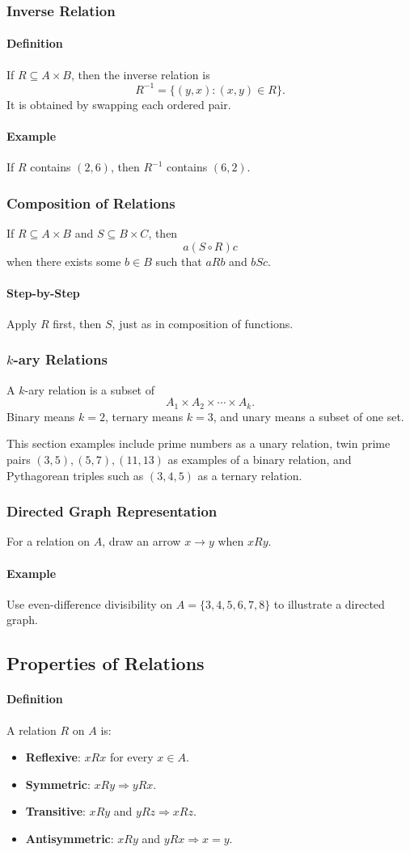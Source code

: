 \documentclass[12pt]{article}
\newcommand{\Definition}{\paragraph{Definition}}
\newcommand{\Step}{\paragraph{Step-by-Step}}
\newcommand{\Example}{\paragraph{Example}}
\begin{document}
\subsubsection{Inverse Relation}
\Definition If $R\subseteq A\times B$, then the inverse relation is
\[
R^{-1}=\{(y,x):(x,y)\in R\}.
\]
It is obtained by swapping each ordered pair.

\Example If $R$ contains $(2,6)$, then $R^{-1}$ contains $(6,2)$.

\subsubsection{Composition of Relations}
If $R\subseteq A\times B$ and $S\subseteq B\times C$, then
\[
a(S\circ R)c
\]
when there exists some $b\in B$ such that $aRb$ and $bSc$.

\Step
Apply $R$ first, then $S$, just as in composition of functions.

\subsubsection{$k$-ary Relations}
A $k$-ary relation is a subset of
\[
A_1\times A_2\times\cdots\times A_k.
\]
Binary means $k=2$, ternary means $k=3$, and unary means a subset of one set.

This section examples include prime numbers as a unary relation, twin prime pairs $(3,5),(5,7),(11,13)$ as examples of a binary relation, and Pythagorean triples such as $(3,4,5)$ as a ternary relation.

\subsubsection{Directed Graph Representation}
For a relation on $A$, draw an arrow $x\rightarrow y$ when $xRy$.

\Example Use even-difference divisibility on $A=\{3,4,5,6,7,8\}$ to illustrate a directed graph.

\subsection{Properties of Relations}

\Definition A relation $R$ on $A$ is:
\begin{itemize}
    \item \textbf{Reflexive}: $xRx$ for every $x\in A$.
    \item \textbf{Symmetric}: $xRy\Rightarrow yRx$.
    \item \textbf{Transitive}: $xRy$ and $yRz\Rightarrow xRz$.
    \item \textbf{Antisymmetric}: $xRy$ and $yRx\Rightarrow x=y$.
\end{itemize}
\end{document}
